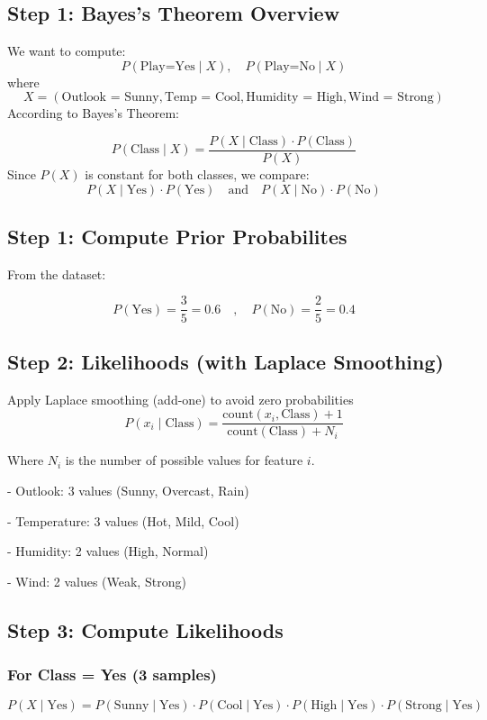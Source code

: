 \documentclass{article}
\begin{document}
\subsection*{Step 1: Bayes's Theorem Overview}
We want to compute:
$$
P(\text{Play=Yes} \mid X), \quad P(\text{Play=No} \mid X)
$$
where $$X = (\text{Outlook = Sunny}, \text{Temp = Cool}, \text{Humidity = High}, \text{Wind = Strong})$$
According to Bayes's Theorem:

$$
P(\text{Class} \mid X) = \frac{P(X \mid \text{Class}) \cdot P(\text{Class})}{P(X)}
$$
Since $P(X)$ is constant for both classes, we compare:
$$
P(X \mid \text{Yes}) \cdot P(\text{Yes}) \quad \text{and} \quad P(X \mid \text{No}) \cdot P(\text{No})
$$

\subsection*{Step 1: Compute Prior Probabilites}
From the dataset:

$$
P(\text{Yes}) = \frac{3}{5} = 0.6
\quad , \quad
P(\text{No}) = \frac{2}{5} = 0.4
$$

\subsection*{Step 2: Likelihoods (with Laplace Smoothing)}

Apply Laplace smoothing (add-one) to avoid zero probabilities
$$
P(x_i \mid \text{Class}) = \frac{\text{count}(x_i, \text{Class}) + 1}{\text{count}(\text{Class}) + N_i}
$$

Where $N_i$ is the number of possible values for feature $i$.

- Outlook: 3 values (Sunny, Overcast, Rain)

- Temperature: 3 values (Hot, Mild, Cool)

- Humidity: 2 values (High, Normal)

- Wind: 2 values (Weak, Strong)

\subsection*{Step 3: Compute Likelihoods}

\subsubsection*{For Class = Yes (3 samples)}

$$
P(X \mid \text{Yes}) = P(\text{Sunny} \mid \text{Yes}) \cdot P(\text{Cool} \mid \text{Yes}) \cdot P(\text{High} \mid \text{Yes}) \cdot P(\text{Strong} \mid \text{Yes})
$$
\end{document}
